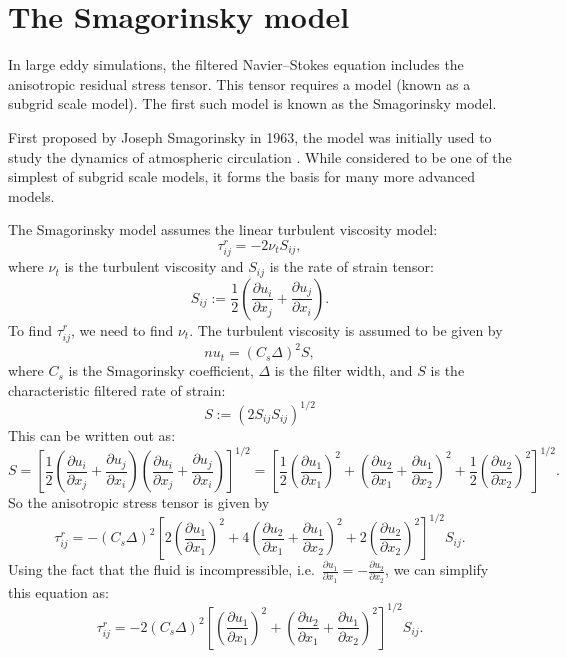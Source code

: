 \documentclass[11pt,a4paper]{article}
\begin{document}
\section{The Smagorinsky model}
In large eddy simulations, the filtered Navier--Stokes equation includes the anisotropic residual stress tensor. This tensor requires a model (known as a subgrid scale model). The first such model is known as the Smagorinsky model.

First proposed by Joseph Smagorinsky in 1963, the model was initially used to study the dynamics of atmospheric circulation \cite{Smagorinsky1963}. While considered to be one of the simplest of subgrid scale models, it forms the basis for many more advanced  models. 

The Smagorinsky model assumes the linear turbulent viscosity model:
$$\tau_{ij}^r = -2\nu_t {S}_{ij},$$
where $\nu_t$ is the turbulent viscosity and $S_{ij}$ is the rate of strain tensor:
$${S}_{ij} := \frac{1}{2}\left( \frac{\partial {u}_i}{\partial x_j} + \frac{\partial {u}_j}{\partial x_i}\right).$$
To find $\tau_{ij}^r$, we need to find $\nu_t$. The turbulent viscosity is assumed to be given by
\begin{equation}\label{smag_nut}
nu_t = (C_s \Delta)^2 {S},
\end{equation}
where $C_s$ is the Smagorinsky coefficient, $\Delta$ is the filter width, and ${S}$ is the characteristic filtered rate of strain:
$${S} := \left(2{S}_{ij}{S}_{ij}\right)^{1/2}$$
This can be written out as:
$${S} = \left[\frac{1}{2}\left( \frac{\partial {u}_i}{\partial x_j} + \frac{\partial {u}_j}{\partial x_i}\right)\left( \frac{\partial {u}_i}{\partial x_j} + \frac{\partial {u}_j}{\partial x_i}\right)\right]^{1/2} = \left[\frac{1}{2}\left( \frac{\partial {u}_1}{\partial x_1}\right)^2+\left( \frac{\partial {u}_2}{\partial x_1} + \frac{\partial {u}_1}{\partial x_2}\right)^2+\frac{1}{2}\left( \frac{\partial {u}_2}{\partial x_2}\right)^2 \right]^{1/2}.$$
So the anisotropic stress tensor is given by
\begin{equation}
\tau_{ij}^r = -(C_s \Delta)^2\left[2\left( \frac{\partial {u}_1}{\partial x_1}\right)^2+4\left( \frac{\partial {u}_2}{\partial x_1} + \frac{\partial {u}_1}{\partial x_2}\right)^2+2\left( \frac{\partial {u}_2}{\partial x_2}\right)^2 \right]^{1/2}{S}_{ij}.
\end{equation}
Using the fact that the fluid is incompressible, i.e.\ $\frac{\partial {u}_1}{\partial x_1} = -\frac{\partial {u}_2}{\partial x_2}$, we can simplify this equation as:
\begin{equation}\label{smagTau}
\tau_{ij}^r = -2(C_s \Delta)^2\left[\left( \frac{\partial {u}_1}{\partial x_1}\right)^2+\left( \frac{\partial {u}_2}{\partial x_1} + \frac{\partial {u}_1}{\partial x_2}\right)^2 \right]^{1/2}{S}_{ij}.
\end{equation}
\end{document}
